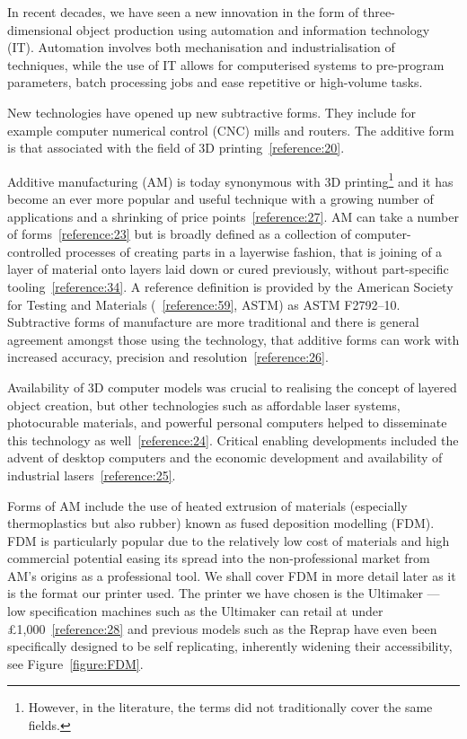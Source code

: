 \documentclass[11pt]{report} %
\begin{document}
In recent decades, we have seen a new innovation in the form of three-dimensional object production using automation and information technology (IT). Automation involves both mechanisation and industrialisation of techniques, while the use of IT allows for computerised systems to pre-program parameters, batch processing jobs and ease repetitive or high-volume tasks.

New technologies have opened up new subtractive forms. They include for example computer numerical control (CNC) mills and routers. The additive form is that associated with the field of 3D printing~\ref{reference:20}. 

Additive manufacturing (AM) is today synonymous with 3D printing\footnote{However, in the literature, the terms did not traditionally cover the same fields.} and it has become an ever more popular and useful technique with a growing number of applications and a shrinking of price points~\ref{reference:27}. AM can take a number of forms~\ref{reference:23} but is broadly defined as a collection of computer-controlled processes of creating parts in a layerwise fashion, that is joining of a layer of material onto layers laid down or cured previously, without part-specific tooling~\ref{reference:34}. A reference definition is provided by the American Society for Testing and Materials (~\ref{reference:59}, ASTM) as ASTM F2792–10. Subtractive forms of manufacture are more traditional and there is general agreement amongst those using the technology, that additive forms can work with increased accuracy, precision and resolution~\ref{reference:26}.

Availability of 3D computer models was crucial to realising the concept of layered object creation, but other technologies such as affordable laser systems, photocurable materials, and powerful personal computers helped to disseminate this technology as well~\ref{reference:24}. Critical enabling developments included the advent of desktop computers and the economic development and availability of industrial lasers~\ref{reference:25}.

Forms of AM include the use of heated extrusion of materials (especially thermoplastics but also rubber) known as fused deposition modelling (FDM). FDM is particularly popular due to the relatively low cost of materials and high commercial potential easing its spread into the non-professional market from AM's origins as a professional tool. We shall cover FDM in more detail later as it is the format our printer used. The printer we have chosen is the Ultimaker --- low specification machines such as the Ultimaker can retail at under £1,000~\ref{reference:28} and previous models such as the Reprap have even been specifically designed to be self replicating, inherently widening their accessibility, see Figure~\ref{figure:FDM}.
\end{document}
